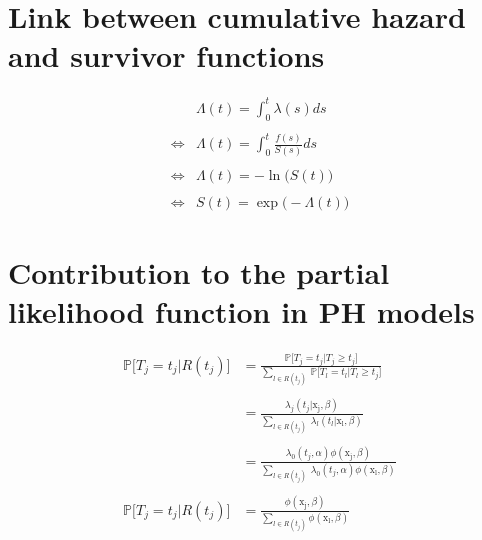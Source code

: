 \documentclass[
]{book}
\begin{document}
\hypertarget{link-between-cumulative-hazard-and-survivor-functions}{%
\section*{Link between cumulative hazard and survivor functions}\label{link-between-cumulative-hazard-and-survivor-functions}}

\begin{equation}
  \begin{aligned}
       & \Lambda(t) = \int_{0}^{t} \lambda(s)ds \\\\
  \iff & \Lambda(t) = \int_{0}^{t} \frac{f(s)}{S(s)}ds \\\\
  \iff & \Lambda(t) = -\ln \big(S(t)\big) \\\\
  \iff & S(t) = \exp \big(-\Lambda(t)\big)
  \end{aligned}
  \label{eq:linksurvcumhaz}
\end{equation}

\hypertarget{contribution-to-the-partial-likelihood-function-in-ph-models}{%
\section*{Contribution to the partial likelihood function in PH models}\label{contribution-to-the-partial-likelihood-function-in-ph-models}}

\begin{equation}
\begin{aligned}
  \mathbb{P}\big[T_j = t_j | R(t_j) \big] & = \frac{\mathbb{P}\big[T_j = t_j | T_j \geq t_j \big]}{\sum_{l \in R(t_j)} \ \mathbb{P}\big[T_l = t_l | T_l \geq t_j \big]} \\\\
  & = \frac{\lambda_j(t_j|\mathrm{x_j}, \beta)}{\sum_{l \in R(t_j)} \ \lambda_l(t_l|\mathrm{x_l}, \beta)} \\\\
  & = \frac{\lambda_0 (t_j, \alpha)\phi(\mathrm{x_j}, \beta)}{\sum_{l \in R(t_j)} \ \lambda_0 (t_j, \alpha)\phi(\mathrm{x_l}, \beta)} \\\\
  \mathbb{P}\big[T_j = t_j | R(t_j) \big] & = \frac{\phi(\mathrm{x_j}, \beta)}{\sum_{l \in R(t_j)} \phi(\mathrm{x_l}, \beta)}
\end{aligned}
\label{eq:contribpartiallikproof}
\end{equation}
\end{document}

